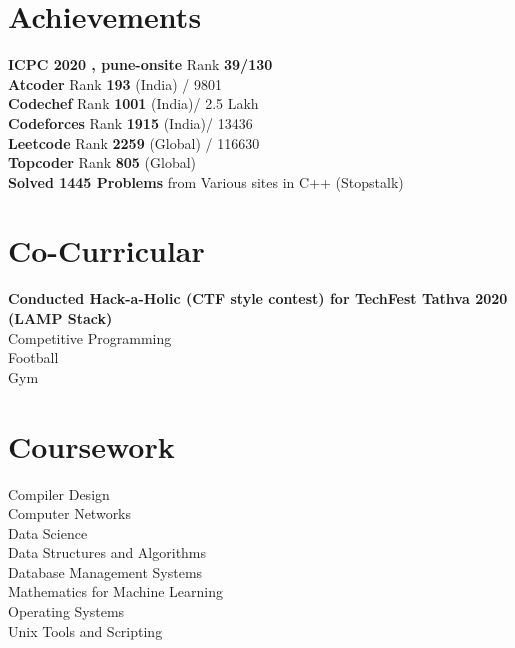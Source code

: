 \documentclass[]{deedy-resume-openfont}
\begin{document}
\begin{minipage}[t]{0.33\textwidth}
\section{Achievements} 
{\bf ICPC 2020 , pune-onsite } Rank {\bf 39/130}  \\
{\bf Atcoder} Rank {\bf 193 }(India)  / 9801 \\
{\bf Codechef} Rank {\bf 1001 }(India)/ 2.5 Lakh\\
{\bf Codeforces} Rank {\bf 1915 }(India)/ 13436\\
{\bf Leetcode} Rank {\bf 2259 } (Global) / 116630\\
{\bf Topcoder} Rank {\bf 805 }(Global)\\
{\bf Solved  1445  Problems } from Various sites
in C++ (Stopstalk)\\


\section{Co-Curricular}
{\bf Conducted Hack-a-Holic (CTF style contest) for TechFest Tathva 2020 (LAMP Stack) } \\ 
Competitive Programming\\ 
Football\\ 
Gym\\ 


\section{Coursework}

Compiler Design \\
Computer Networks\\ 
Data Science \\
Data Structures and Algorithms \\
Database Management Systems \\
Mathematics for Machine Learning \\
Operating Systems \\
Unix Tools and Scripting \\


%
%

\end{minipage} 
\end{document}
